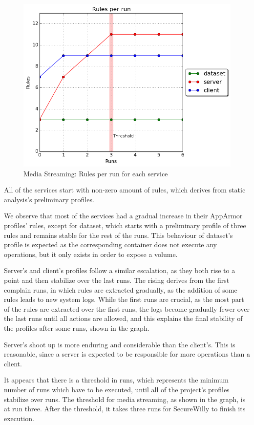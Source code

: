 \begin{figure}[h!]
  \centering
   \includegraphics[width=0.70\linewidth]{./figures/mediastreaming/rulesthreshold.png}
   \caption{Media Streaming: Rules per run for each service}
\end{figure}

All of the services start with non-zero amount of rules, which derives from static analysis's preliminary profiles.

We observe that most of the services had a gradual increase in their AppArmor profiles' rules, except for dataset, which starts with a preliminary profile of three rules and remains stable for the rest of the runs. This behaviour of dataset's profile is expected as the corresponding container does not execute any operations, but it only exists in order to expose a volume.

Server's and client's profiles follow a similar escalation, as they both rise to a point and then stabilize over the last runs. The rising derives from the first complain runs, in which rules are extracted gradually, as the addition of some rules leads to new system logs. While the first runs are crucial, as the most part of the rules are extracted over the first runs, the logs become gradually fewer over the last runs until all actions are allowed, and this explains the final stability of the profiles after some runs, shown in the graph.

Server's shoot up is more enduring and considerable than the client's. This is reasonable, since a server is expected to be responsible for more operations than a client.  

It appears that there is a threshold in runs, which represents the minimum number of runs which have to be executed, until all of the project's profiles stabilize over runs. The threshold for media streaming, as shown in the graph, is at run three. After the threshold, it takes three runs for SecureWilly to finish its execution.

